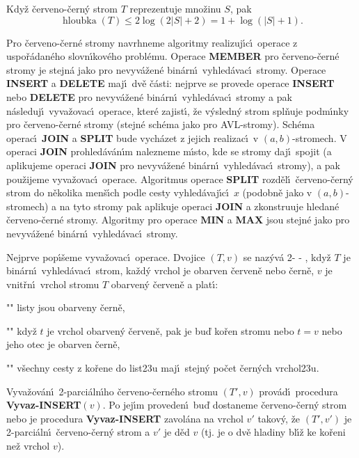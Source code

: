 \documentclass[a4paper,12pt]{article}
\def \emph#1{\underbar{#1}}
\DeclareMathOperator*{\hloubka}{hloubka}
\begin{document}
Kdy\v z \v cerveno-\v cern\'y strom $T$ 
reprezentuje mno\v zinu $S$, pak $$\hloubka(T)\le 2\log(2|S|+2)=1+\log(|S|+1).$$
\endproclaim

\flushpar Pro \v cerveno-\v cern\'e stromy navrhneme algoritmy 
realizuj\'\i c\'\i\ ope\-race z uspo\v r\'adan\'eho slovn\'\i\-ko\-v\'eho probl\'emu.  
Operace {\bf MEMBER} pro \v cerveno-\v cern\'e stromy je stejn\'a jako pro 
nevyv\'a\v zen\'e bin\'arn\'\i\ vyhled\'avac\'\i\ stromy. Operace 
{\bf IN\-SERT} a {\bf DELETE} maj\'\i\ dv\v e \v c\'asti:  nejprve se provede 
ope\-race {\bf INSERT} nebo {\bf DELETE} pro nevyv\'a\v zen\'e bin\'arn\'\i\ 
vy\-hled\'avac\'\i\ stromy a pak n\'asleduj\'\i\ vyva\v zovac\'\i\ operace, kter\'e 
zajist\'\i , \v ze v\'ysledn\'y strom spl\v nuje pod\-m\'\i n\-ky pro \v cerveno-\v cern\'e 
stromy (stejn\'e sch\'ema jako pro AVL-stromy). Sch\'ema operac\'\i\ 
{\bf JOIN} a {\bf SPLIT} bude vych\'azet z jejich realizac\'\i\ v $
(a,b)$-stromech. 
V operaci {\bf JOIN} prohled\'av\'an\'\i m nalezneme m\'\i sto, kde se 
stromy  
daj\'\i\ spojit (a aplikujeme operaci {\bf JOIN} pro 
nevyv\'a\v zen\'e 
bin\'arn\'\i\ vyhled\'a\-va\-c\'\i\ stromy), a pak pou\v zijeme 
vyva\v zovac\'\i\ operace. Algoritmus ope\-race {\bf SPLIT} rozd\v el\'\i\ \v cerveno-\v cern\'y strom 
do n\v ekolika men\v s\'\i ch podle cesty vyhled\'avaj\'\i c\'\i\ $
x$ (podobn\v e jako 
v $(a,b)$-stromech) a na tyto stromy pak aplikuje operaci {\bf JOIN }
a zkonstruuje hledan\'e \v cerveno-\v cern\'e stromy. Algoritmy pro 
ope\-race {\bf MIN} a {\bf MAX} jsou stejn\'e jako pro nevyv\'a\v zen\'e bin\'arn\'\i\ 
vyhled\'avac\'\i\ stromy.
\medskip

\flushpar Nejprve pop\'\i\v seme vyva\v zovac\'\i\ operace. 
Dvojice $(T,v)$ se naz\'yv\'a 2-\emph{parci\'aln\'\i}
\emph{\v cerveno}-\emph{\v cern\'y} \emph{strom}, kdy\v z $T$ je 
bin\'arn\'\i\ vyhled\'avac\'\i\ strom, ka\v zd\'y vrchol je obarven 
\v cerven\v e nebo \v cern\v e, $v$ je 
vnit\v rn\'\i\ vrchol stromu $T$ obarven\'y \v cerven\v e a plat\'\i :
\roster
\item"{}"
listy jsou obarveny \v cern\v e,
\item"{}"
kdy\v z $t$ je vrchol obarven\'y \v cerven\v e, pak je bu\v d ko\v ren 
stromu nebo $t=v$ nebo jeho otec je obarven \v cern\v e,
\item"{}"
v\v sechny cesty z ko\v rene do list\accent23u maj\'\i\ stejn\'y 
po\v cet \v cer\-n\'ych vrchol\accent23u.
\endroster
\medskip

\flushpar Vyva\v zov\'an\'\i\ 2-parci\'aln\'\i ho \v cerveno-\v cern\'eho stromu $(T',v)$ 
pro\-v\'a\-d\'\i\ procedura {\bf Vyvaz-IN\-SERT$(v)$}.  Po jej\'\i m 
proveden\'\i\ bu\v d do\-sta\-neme \v cer\-ve\-no-\v cern\'y strom nebo 
je procedura {\bf Vyvaz-IN\-SERT} zavol\'ana na vrchol $
v'$ takov\'y, 
\v ze $(T',v')$ je 2-parci\'aln\'\i\ \v cerve\-no-\v cern\'y strom a $
v'$ je d\v ed $v$ 
(tj.  je o dv\v e hladiny bl\'\i\v z ke ko\v reni ne\v z vrchol $
v$). 
\medskip
\end{document}
